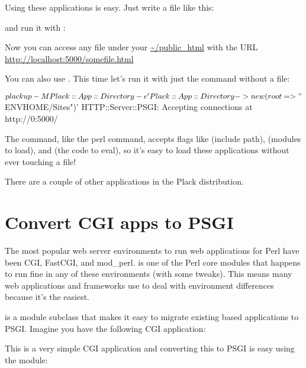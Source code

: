 Using these applications is easy. Just write a  file like this:

%
and run it with :


Now you can access any file under your \url{~/public_html} with
the URL \url{http://localhost:5000/somefile.html}

You can also use . This time let's run it with just
the  command without a  file:

\begin{shell}
$ plackup -MPlack::App::Directory -e 'Plack::App::Directory->new(root => "$ENV{HOME}/Sites")'
HTTP::Server::PSGI: Accepting connections at http://0:5000/
\end{shell}

The  command, like the perl command, accepts flags like
 (include path),  (modules to load), and
 (the code to eval), so it's easy to load these
 applications without ever touching a  file!

There are a couple of other  applications in the Plack
distribution.

\chapter{Convert CGI apps to
PSGI}\label{day-6-convert-cgi-apps-to-psgi}

The most popular web server environments to run web applications for
Perl have been CGI, FastCGI, and mod\_perl.  is one of the Perl
core modules that happens to run fine in any of these environments (with
some tweaks). This means many web applications and frameworks use 
to deal with environment differences because it's the easiest.

\href{http://search.cpan.org/perldoc?CGI::PSGI}{} is a 
module subclass that makes it easy to migrate existing  based
applications to PSGI. Imagine you have the following CGI application:


This is a very simple CGI application and converting this to PSGI is
easy using the  module:


